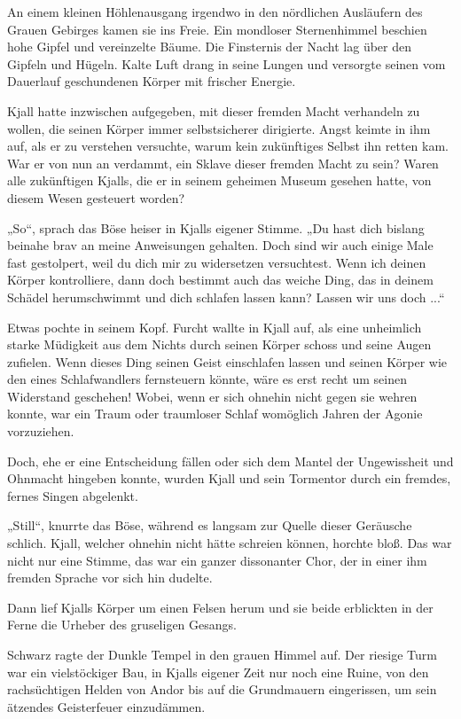 An einem kleinen Höhlenausgang irgendwo in den nördlichen Ausläufern des Grauen Gebirges kamen sie ins Freie. Ein mondloser Sternenhimmel beschien hohe Gipfel und vereinzelte Bäume. Die Finsternis der Nacht lag über den Gipfeln und Hügeln. Kalte Luft drang in seine Lungen und versorgte seinen vom Dauerlauf geschundenen Körper mit frischer Energie.

Kjall hatte inzwischen aufgegeben, mit dieser fremden Macht verhandeln zu wollen, die seinen Körper immer selbstsicherer dirigierte. Angst keimte in ihm auf, als er zu verstehen versuchte, warum kein zukünftiges Selbst ihn retten kam. War er von nun an verdammt, ein Sklave dieser fremden Macht zu sein? Waren alle zukünftigen Kjalls, die er in seinem geheimen Museum gesehen hatte, von diesem Wesen gesteuert worden?

„So“, sprach das Böse heiser in Kjalls eigener Stimme. „Du hast dich bislang beinahe brav an meine Anweisungen gehalten. Doch sind wir auch einige Male fast gestolpert, weil du dich mir zu widersetzen versuchtest. Wenn ich deinen Körper kontrolliere, dann doch bestimmt auch das weiche Ding, das in deinem Schädel herumschwimmt und dich schlafen lassen kann? Lassen wir uns doch ...“

Etwas pochte in seinem Kopf. Furcht wallte in Kjall auf, als eine unheimlich starke Müdigkeit aus dem Nichts durch seinen Körper schoss und seine Augen zufielen. Wenn dieses Ding seinen Geist einschlafen lassen und seinen Körper wie den eines Schlafwandlers fernsteuern könnte, wäre es erst recht um seinen Widerstand geschehen! Wobei, wenn er sich ohnehin nicht gegen sie wehren konnte, war ein Traum oder traumloser Schlaf womöglich Jahren der Agonie vorzuziehen.

Doch, ehe er eine Entscheidung fällen oder sich dem Mantel der Ungewissheit und Ohnmacht hingeben konnte, wurden Kjall und sein Tormentor durch ein fremdes, fernes Singen abgelenkt.

„Still“, knurrte das Böse, während es langsam zur Quelle dieser Geräusche schlich. Kjall, welcher ohnehin nicht hätte schreien können, horchte bloß. Das war nicht nur eine Stimme, das war ein ganzer dissonanter Chor, der in einer ihm fremden Sprache vor sich hin dudelte.

Dann lief Kjalls Körper um einen Felsen herum und sie beide erblickten in der Ferne die Urheber des gruseligen Gesangs.

Schwarz ragte der Dunkle Tempel in den grauen Himmel auf. Der riesige Turm war ein vielstöckiger Bau, in Kjalls eigener Zeit nur noch eine Ruine, von den rachsüchtigen Helden von Andor bis auf die Grundmauern eingerissen, um sein ätzendes Geisterfeuer einzudämmen.


